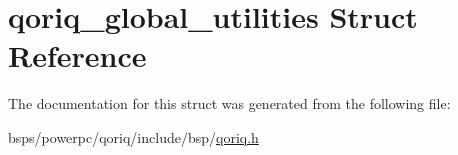 \hypertarget{structqoriq__global__utilities}{}\section{qoriq\+\_\+global\+\_\+utilities Struct Reference}
\label{structqoriq__global__utilities}


The documentation for this struct was generated from the following file\+:\begin{DoxyCompactItemize}
\item 
bsps/powerpc/qoriq/include/bsp/\mbox{\hyperlink{qoriq_8h}{qoriq.\+h}}\end{DoxyCompactItemize}
